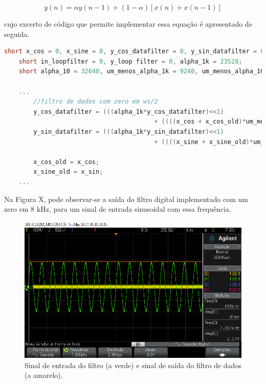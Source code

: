 \documentclass[11pt]{article}
\numberwithin{equation}{section}
\begin{document}
\vspace{-3mm}
\begin{equation}
y(n) = \alpha y(n-1) +  (1-\alpha)[x(n) + x(n-1)]
\end{equation} 

\vspace{1mm}
cujo excerto de código que permite implementar essa equação é apresentado de seguida.

\begin{lstlisting}[language=C]
	short x_cos = 0, x_sine = 0, y_cos_datafilter = 0, y_sin_datafilter = 0;  
	short in_loopfilter = 0, y_loop filter = 0, alpha_1k = 23528; 
	short alpha_10 = 32640, um_menos_alpha_1k = 9240, um_menos_alpha_10 = 127;
	
	...
		//filtro de dados com zero em ws/2
		y_cos_datafilter = (((alpha_1k*y_cos_datafilter)<<1) 
										 + ((((x_cos + x_cos_old)*um_menos_alpha_1k)>>1)<<1))>>16;
		y_sin_datafilter = (((alpha_1k*y_sin_datafilter)<<1) 
										 + ((((x_sine + x_sine_old)*um_menos_alpha_1k)>>1)<<1))>>16;

		x_cos_old = x_cos;
		x_sine_old = x_sin;
	...
\end{lstlisting}

Na Figura X, pode observar-se a saída do filtro digital implementado com um zero em 8 kHz, para um sinal de entrada sinusoidal com essa frequência. 

\begin{figure}[H]
	\centering
	\includegraphics[keepaspectratio=true, scale=0.37]{exps/FiltroComZero8k}
	\caption{Sinal de entrada do filtro (a verde) e sinal de saída do filtro de dados (a amarelo).}
	\vspace{-0.8em}
\end{figure} 
\end{document}
